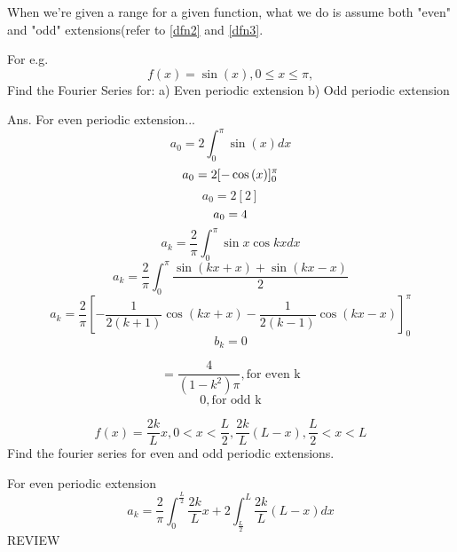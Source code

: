 \documentclass[twoside]{report}
\begin{document}
When we're given a range for a given function, what we do is assume both "even" and "odd" extensions(refer to \ref{dfn2} and \ref{dfn3}.

For e.g.
$$
f(x) = \sin{(x)}, 0\leq x\leq\pi,$$
Find the Fourier Series for:
a) Even periodic extension 
b) Odd periodic extension

Ans.
For even periodic extension...
\begin{displaymath}
    a_0 = 2\int_{0}^{\pi} \sin{(x)}dx    
\end{displaymath}
\begin{displaymath}
    a_0 = 2 [-\cos{(x)}]_0^{\pi} \\
    \end{displaymath}
    \begin{displaymath}
        a_0 = 2 [2]
    \end{displaymath}
    \begin{displaymath}
        a_0 = 4 \\
    \end{displaymath}
    \begin{displaymath}
        a_k = \frac{2}{\pi}\int_0^{\pi} \sin{x} \cos{kx} dx
    \end{displaymath}
    \begin{displaymath}
        a_k = \frac{2}{\pi} \int_0^{\pi} \frac{\sin{(kx + x)} + \sin{(kx-x)}}{2}
    \end{displaymath}
    \begin{displaymath}
        a_k = \frac{2}{\pi} [-\frac{1}{2(k+1)}\cos{(kx+x)} - \frac{1}{2(k-1)}\cos{(kx-x)}]_0^\pi
    \end{displaymath}
    \begin{displaymath}
        b_k = 0
    \end{displaymath}

\begin{displaymath}
   = \frac{4}{(1-k^2)\pi}, \text{for even k}
\end{displaymath}
\begin{displaymath}
   0, \text{for odd k}
\end{displaymath}

\begin{question}
   \[f(x) = \frac{2k}{L} x, 0 < x < \frac{L}{2}, \frac{2k}{L}(L-x), \frac{L}{2}<x<L\]
    Find the fourier series for even and odd periodic extensions.
\end{question}
\begin{solution}
   For even periodic extension
   \[
      a_k = \frac{2}{\pi} \int_0^{\frac{L}{2}} \frac{2k}{L} x + 2 \int_{\frac{L}{2}}^{L} \frac{2k}{L}(L-x)dx
   \]
   REVIEW
\end{solution}
\pagebreak
\end{document}
